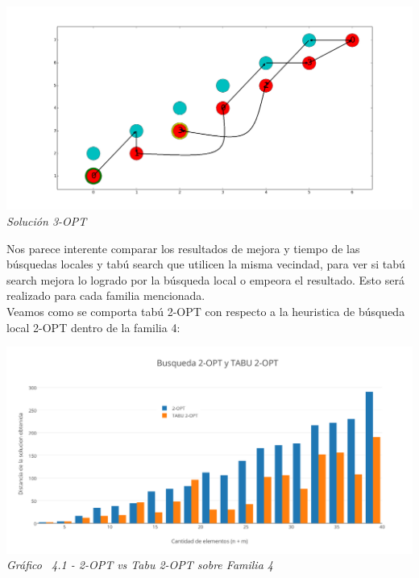 \vspace*{0.3cm} \vspace*{0.3cm}
  \begin{center}
 \includegraphics[scale=0.3]{./EJ4/fam43opt.png}\\
 {            \textit{Soluci\'on 3-OPT}}
  \end{center}
  \vspace*{0.3cm}

Nos parece interente comparar los resultados de mejora y tiempo de las búsquedas locales y tabú search que utilicen la misma vecindad, para ver si tabú search mejora lo logrado por la búsqueda local o empeora el resultado. Esto será realizado para cada familia mencionada.\\

Veamos como se comporta tabú 2-OPT con respecto a la heuristica de búsqueda local 2-OPT dentro de la familia 4:

\vspace*{0.3cm} \vspace*{0.3cm}
  \begin{center}
 \includegraphics[scale=0.5]{./EJ4/comparativogym02opt.png}\\
 {            \textit{Gráfico \ 4.1 - 2-OPT vs Tabu 2-OPT sobre Familia 4}}
  \end{center}
  \vspace*{0.3cm}

